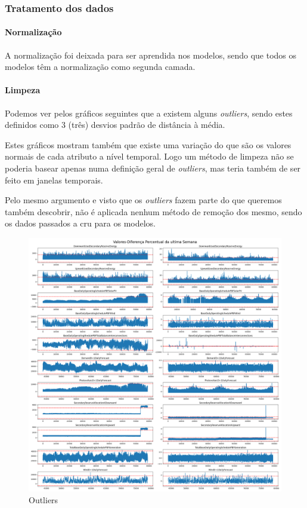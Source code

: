 


\subsubsection{Tratamento dos dados}

\paragraph{Normalização} \par
\text{ }  \par

A normalização foi deixada para ser aprendida nos modelos, sendo que todos os modelos têm a normalização como segunda camada.\par

\paragraph{Limpeza} \par
\text{ }  \par

Podemos ver pelos gráficos seguintes que a existem alguns \textit{outliers}, sendo estes definidos como 3 (três) desvios padrão de distância à média.\par
Estes gráficos mostram também que existe uma variação do que são os valores normais de cada atributo a nível temporal. Logo um método de limpeza não se poderia basear apenas numa definição geral de \textit{outliers}, mas teria também de ser feito em janelas temporais.\par
Pelo mesmo argumento e visto que os \textit{outliers} fazem parte do que queremos também descobrir, não é aplicada nenhum método de remoção dos mesmo, sendo os dados passados a cru para os modelos.\par


\begin{figure}[H]
  \centering
  \includegraphics[width=\textwidth]{plots/Outliers_3stds.png}
  \caption{Outliers}
\end{figure}

